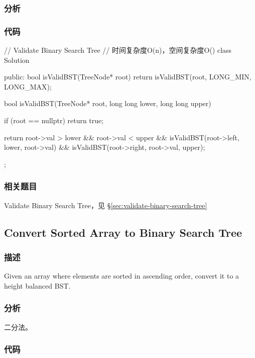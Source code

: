 \subsubsection{分析}


\subsubsection{代码}

\begin{Code}
// Validate Binary Search Tree
// 时间复杂度O(n)，空间复杂度O(\logn)
class Solution {
public:
    bool isValidBST(TreeNode* root) {
        return isValidBST(root, LONG_MIN, LONG_MAX);
    }

    bool isValidBST(TreeNode* root, long long lower, long long upper) {
        if (root == nullptr) return true;

        return root->val > lower && root->val < upper
                && isValidBST(root->left, lower, root->val)
                && isValidBST(root->right, root->val, upper);
    }
};
\end{Code}


\subsubsection{相关题目}
\begindot
\item Validate Binary Search Tree，见 \S \ref{sec:validate-binary-search-tree}
\myenddot


\subsection{Convert Sorted Array to Binary Search Tree}
\label{sec:convert-sorted-array-to-binary-search-tree}


\subsubsection{描述}
Given an array where elements are sorted in ascending order, convert it to a height balanced BST.


\subsubsection{分析}
二分法。


\subsubsection{代码}

